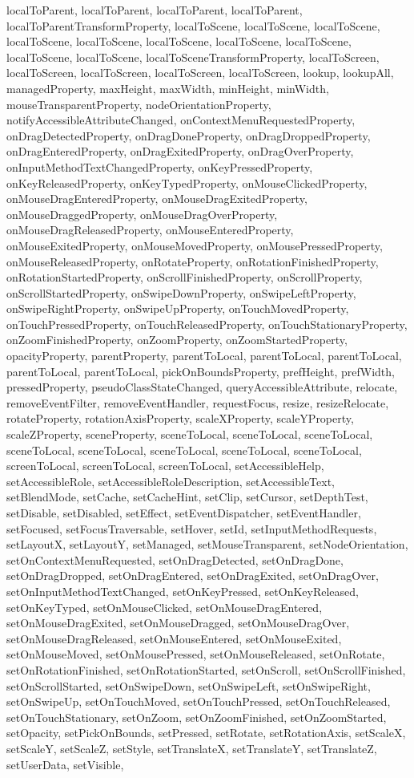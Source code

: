 {{{{{{{{{{{{{{{{{{{{{{{{{{{{{{{{{{{{{{{{{{{localToParent, localToParent, localToParent, localToParent, localToParentTransformProperty, localToScene, localToScene, localToScene, localToScene, localToScene, localToScene, localToScene, localToScene, localToScene, localToScene, localToSceneTransformProperty, localToScreen, localToScreen, localToScreen, localToScreen, localToScreen, lookup, lookupAll, managedProperty, maxHeight, maxWidth, minHeight, minWidth, mouseTransparentProperty, nodeOrientationProperty, notifyAccessibleAttributeChanged, onContextMenuRequestedProperty, onDragDetectedProperty, onDragDoneProperty, onDragDroppedProperty, onDragEnteredProperty, onDragExitedProperty, onDragOverProperty, onInputMethodTextChangedProperty, onKeyPressedProperty, onKeyReleasedProperty, onKeyTypedProperty, onMouseClickedProperty, onMouseDragEnteredProperty, onMouseDragExitedProperty, onMouseDraggedProperty, onMouseDragOverProperty, onMouseDragReleasedProperty, onMouseEnteredProperty, onMouseExitedProperty, onMouseMovedProperty, onMousePressedProperty, onMouseReleasedProperty, onRotateProperty, onRotationFinishedProperty, onRotationStartedProperty, onScrollFinishedProperty, onScrollProperty, onScrollStartedProperty, onSwipeDownProperty, onSwipeLeftProperty, onSwipeRightProperty, onSwipeUpProperty, onTouchMovedProperty, onTouchPressedProperty, onTouchReleasedProperty, onTouchStationaryProperty, onZoomFinishedProperty, onZoomProperty, onZoomStartedProperty, opacityProperty, parentProperty, parentToLocal, parentToLocal, parentToLocal, parentToLocal, parentToLocal, pickOnBoundsProperty, prefHeight, prefWidth, pressedProperty, pseudoClassStateChanged, queryAccessibleAttribute, relocate, removeEventFilter, removeEventHandler, requestFocus, resize, resizeRelocate, rotateProperty, rotationAxisProperty, scaleXProperty, scaleYProperty, scaleZProperty, sceneProperty, sceneToLocal, sceneToLocal, sceneToLocal, sceneToLocal, sceneToLocal, sceneToLocal, sceneToLocal, sceneToLocal, screenToLocal, screenToLocal, screenToLocal, setAccessibleHelp, setAccessibleRole, setAccessibleRoleDescription, setAccessibleText, setBlendMode, setCache, setCacheHint, setClip, setCursor, setDepthTest, setDisable, setDisabled, setEffect, setEventDispatcher, setEventHandler, setFocused, setFocusTraversable, setHover, setId, setInputMethodRequests, setLayoutX, setLayoutY, setManaged, setMouseTransparent, setNodeOrientation, setOnContextMenuRequested, setOnDragDetected, setOnDragDone, setOnDragDropped, setOnDragEntered, setOnDragExited, setOnDragOver, setOnInputMethodTextChanged, setOnKeyPressed, setOnKeyReleased, setOnKeyTyped, setOnMouseClicked, setOnMouseDragEntered, setOnMouseDragExited, setOnMouseDragged, setOnMouseDragOver, setOnMouseDragReleased, setOnMouseEntered, setOnMouseExited, setOnMouseMoved, setOnMousePressed, setOnMouseReleased, setOnRotate, setOnRotationFinished, setOnRotationStarted, setOnScroll, setOnScrollFinished, setOnScrollStarted, setOnSwipeDown, setOnSwipeLeft, setOnSwipeRight, setOnSwipeUp, setOnTouchMoved, setOnTouchPressed, setOnTouchReleased, setOnTouchStationary, setOnZoom, setOnZoomFinished, setOnZoomStarted, setOpacity, setPickOnBounds, setPressed, setRotate, setRotationAxis, setScaleX, setScaleY, setScaleZ, setStyle, setTranslateX, setTranslateY, setTranslateZ, setUserData, setVisible, }}}}}}}}}}}}}}}}}}}}}}}}}}}}}}}}}}}}}}}}}}}
